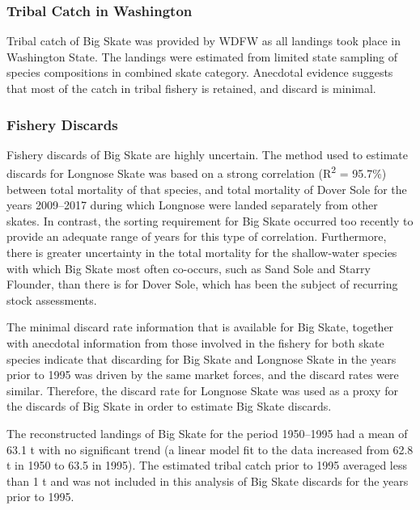 \documentclass[12pt,]{article}
\begin{document}
\hypertarget{tribal-catch-in-washington}{%
\subsubsection{Tribal Catch in
Washington}\label{tribal-catch-in-washington}}

Tribal catch of Big Skate was provided by WDFW as all landings took
place in Washington State. The landings were estimated from limited
state sampling of species compositions in combined skate category.
Anecdotal evidence suggests that most of the catch in tribal fishery is
retained, and discard is minimal.

\hypertarget{fishery-discards}{%
\subsubsection{Fishery Discards}\label{fishery-discards}}

Fishery discards of Big Skate are highly uncertain. The method used to
estimate discards for Longnose Skate was based on a strong correlation
(R\textsuperscript{2} = 95.7\%) between total mortality of that species,
and total mortality of Dover Sole for the years 2009--2017 during which
Longnose were landed separately from other skates. In contrast, the
sorting requirement for Big Skate occurred too recently to provide an
adequate range of years for this type of correlation. Furthermore, there
is greater uncertainty in the total mortality for the shallow-water
species with which Big Skate most often co-occurs, such as Sand Sole and
Starry Flounder, than there is for Dover Sole, which has been the
subject of recurring stock assessments.

The minimal discard rate information that is available for Big Skate,
together with anecdotal information from those involved in the fishery
for both skate species indicate that discarding for Big Skate and
Longnose Skate in the years prior to 1995 was driven by the same market
forces, and the discard rates were similar. Therefore, the discard rate
for Longnose Skate was used as a proxy for the discards of Big Skate in
order to estimate Big Skate discards.

The reconstructed landings of Big Skate for the period 1950--1995 had a
mean of 63.1 t with no significant trend (a linear model fit to the data
increased from 62.8 t in 1950 to 63.5 in 1995). The estimated tribal
catch prior to 1995 averaged less than 1 t and was not included in this
analysis of Big Skate discards for the years prior to 1995.
\end{document}
